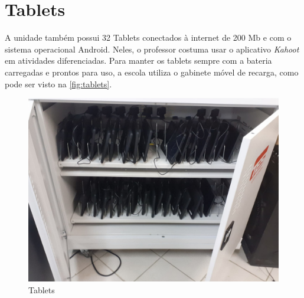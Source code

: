 \section{Tablets} %
\label{sec:Tablets}
A unidade também possui 32 Tablets conectados à internet de 200 Mb e com o sistema operacional Android. Neles, o professor costuma usar o aplicativo \emph{Kahoot} em atividades diferenciadas. Para manter os tablets sempre com a bateria carregadas e prontos para uso, a escola utiliza o gabinete móvel de recarga, como pode ser visto na \autoref{fig:tablets}.
\vspace{10pt}

\begin{figure}[htb!]
	\centering
	\includegraphics[width=.7\linewidth]{assets/tablets.jpeg}
	\caption{Tablets}
	\label{fig:tablets}
\end{figure}

